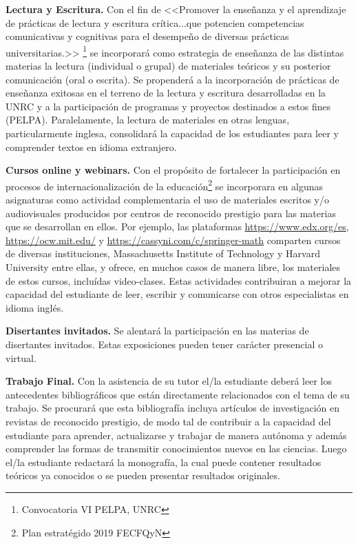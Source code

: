 \documentclass[a4paper, 12pt]{article}
\begin{document}
\begin{description}
\item{\textbf{Lectura y Escritura.}} Con el fin de <<Promover la enseñanza y el aprendizaje de prácticas de lectura y escritura crítica...que potencien competencias comunicativas y cognitivas para el desempeño de diversas prácticas universitarias.>> \footnote{Convocatoria VI PELPA, UNRC}  se incorporará  como estrategia de enseñanza de las distintas  materias la lectura (individual o grupal) de materiales teóricos y su posterior comunicación (oral o escrita). Se propenderá a la incorporación  de prácticas de enseñanza exitosas en el terreno de la lectura y escritura desarrolladas en la UNRC \cite{roldan2022} y a la participación de programas y proyectos destinados a estos fines (PELPA).  Paralelamente, la lectura de materiales en otras lenguas, particularmente inglesa, consolidará la capacidad de los estudiantes para leer y comprender textos en idioma extranjero.  


\item{\textbf{Cursos online y webinars.}} Con el propósito de fortalecer  la participación en procesos de internacionalización de la educación\footnote{Plan estratégido 2019 FECFQyN}  se  incorporara en algunas asignaturas como actividad complementaria el uso de materiales escritos y/o audiovisuales producidos por centros de reconocido prestigio para las materias que se desarrollan en ellos. Por ejemplo, las plataformas \href{https://www.edx.org/es}{https://www.edx.org/es}, \href{https://ocw.mit.edu/}{https://ocw.mit.edu/} y  \href{https://cassyni.com/c/springer-math}{https://cassyni.com/c/springer-math} comparten cursos de diversas instituciones, Massachusetts Institute of Technology y Harvard University entre ellas, y ofrece, en muchos casos de manera libre, los materiales de estos cursos, incluídas video-clases. Estas actividades contribuiran a mejorar la capacidad del estudiante de leer, escribir y comunicarse con
otros especialistas en idioma inglés. 


\item{\textbf{Disertantes invitados.}} Se alentará la participación en las materias de disertantes invitados. Estas exposiciones pueden tener carácter presencial o virtual.   

\item{\textbf{Trabajo Final.}}   Con la asistencia de su tutor el/la estudiante deberá leer los antecedentes bibliográficos que están directamente relacionados con el tema de su trabajo. Se procurará que esta bibliografía incluya artículos de investigación en revistas de reconocido prestigio, de modo tal de contribuir a la capacidad del estudiante para aprender, actualizarse y trabajar de manera autónoma y además  comprender las formas de transmitir conocimientos nuevos en las ciencias. Luego el/la estudiante  redactará la monografía, la cual puede contener resultados teóricos ya conocidos o se pueden presentar resultados originales.



\end{description}
\end{document}
